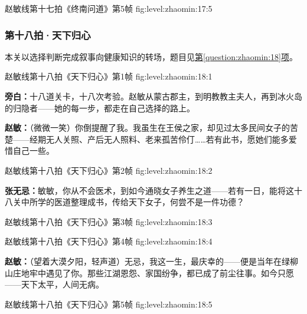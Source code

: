 \clearpage

  {赵敏线第十七拍《终南问道》第5帧}
  {fig:level:zhaomin:17:5}
  {\scriptsize}
  {\mbox{}}

\subsubsection{第十八拍·天下归心}\label{plot:zhaomin:18}
本关以选择判断完成叙事向健康知识的转场，题目见\hyperref[question:zhaomin:18]{第\ref*{question:zhaomin:18}项}。

  {赵敏线第十八拍《天下归心》第1帧}
  {fig:level:zhaomin:18:1}
  {\scriptsize}
  {\textbf{旁白：}十八道关卡，十八次考验。赵敏从蒙古郡主，到明教教主夫人，再到冰火岛的归隐者——她的每一步，都走在自己选择的路上。\par
\textbf{赵敏：}（微微一笑）你倒提醒了我。我虽生在王侯之家，却见过太多民间女子的苦楚——经期无人关照、产后无人照料、老来孤苦伶仃……若有此书，愿她们能多爱惜自己一些。\par}

  {赵敏线第十八拍《天下归心》第2帧}
  {fig:level:zhaomin:18:2}
  {\scriptsize}
  {\textbf{张无忌：}敏敏，你从不会医术，到如今通晓女子养生之道——若有一日，能将这十八关中所学的医道整理成书，传给天下女子，何尝不是一件功德？\par}

\clearpage

  {赵敏线第十八拍《天下归心》第3帧}
  {fig:level:zhaomin:18:3}
  {\scriptsize}
  {\mbox{}}

  {赵敏线第十八拍《天下归心》第4帧}
  {fig:level:zhaomin:18:4}
  {\scriptsize}
  {\textbf{赵敏：}（望着大漠夕阳，轻声道）无忌，我这一生，最庆幸的——便是当年在绿柳山庄地牢中遇见了你。那些江湖恩怨、家国纷争，都已成了前尘往事。如今只愿——天下太平，人间无病。\par}

  {赵敏线第十八拍《天下归心》第5帧}
  {fig:level:zhaomin:18:5}
  {\scriptsize}
  {\mbox{}}

\clearpage
